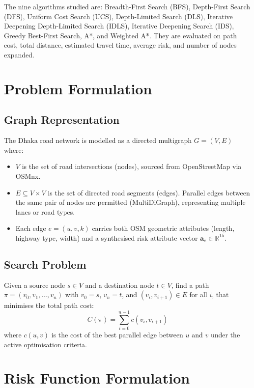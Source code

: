 ﻿\documentclass[a4paper, 12pt]{article}
\theoremstyle{remark}
\begin{document}
The nine algorithms studied are: Breadth-First Search (BFS), Depth-First Search (DFS), Uniform Cost Search (UCS), Depth-Limited Search (DLS), Iterative Deepening Depth-Limited Search (IDLS), Iterative Deepening Search (IDS), Greedy Best-First Search, A*, and Weighted A*. They are evaluated on path cost, total distance, estimated travel time, average risk, and number of nodes expanded.

\section{Problem Formulation}

\subsection{Graph Representation}

The Dhaka road network is modelled as a directed multigraph $G = (V, E)$ where:
\begin{itemize}
    \item $V$ is the set of road intersections (nodes), sourced from OpenStreetMap via OSMnx.
    \item $E \subseteq V \times V$ is the set of directed road segments (edges). Parallel edges between the same pair of nodes are permitted (MultiDiGraph), representing multiple lanes or road types.
    \item Each edge $e = (u, v, k)$ carries both OSM geometric attributes (length, highway type, width) and a synthesised risk attribute vector $\mathbf{a}_e \in \mathbb{R}^{15}$.
\end{itemize}

\subsection{Search Problem}

Given a source node $s \in V$ and a destination node $t \in V$, find a path $\pi = (v_0, v_1, \ldots, v_n)$ with $v_0 = s$, $v_n = t$, and $(v_i, v_{i+1}) \in E$ for all $i$, that minimises the total path cost:
\[
    C(\pi) = \sum_{i=0}^{n-1} c(v_i, v_{i+1})
\]
where $c(u,v)$ is the cost of the best parallel edge between $u$ and $v$ under the active optimisation criteria.

\section{Risk Function Formulation}
\end{document}
